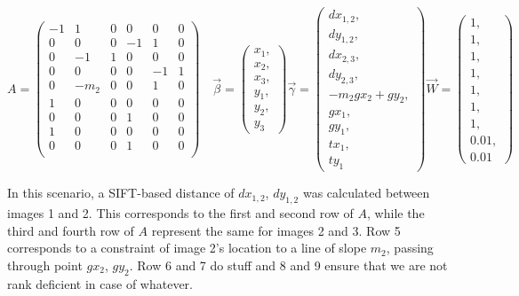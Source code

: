 \documentclass[]{spie}  %
\begin{document}
\[
A =
\begin{pmatrix}
  -1 & 1 & 0 & 0 & 0 & 0\\
  0 & 0 & 0 & -1 & 1 & 0\\
  0 & -1 & 1 & 0 & 0 & 0\\
  0 & 0 & 0 & 0 & -1 & 1\\
  0 & -m_2 & 0 & 0 & 1 & 0\\
  1 & 0 & 0 & 0 & 0 & 0\\
  0 & 0 & 0 & 1 & 0 & 0\\
  1 & 0 & 0 & 0 & 0 & 0\\
  0 & 0 & 0 & 1 & 0 & 0\\

\end{pmatrix}\quad
\vec{\beta} =
\begin{pmatrix}
  x_1, \\ x_2, \\ x_3, \\ y_1, \\ y_2, \\ y_3
\end{pmatrix}
\vec{\gamma} =
\begin{pmatrix}
  dx_{1,2}, \\ dy_{1,2}, \\ dx_{2,3}, \\ dy_{2,3}, \\ -m_2gx_2 + gy_2, 
  \\ gx_1, \\ gy_1, \\ tx_1, \\ ty_1
  
\end{pmatrix}
\vec{W} = 
\begin{pmatrix}
  1, \\ 1, \\ 1, \\ 1, \\ 1, \\ 1, \\ 1, \\ 0.01, \\ 0.01
\end{pmatrix}
\]


In this scenario, a SIFT-based distance of $dx_{1,2}$, $dy_{1,2}$ was
calculated between images 1 and 2. This corresponds to the first and
second row of $A$, while the third and fourth row of $A$ represent the
same for images 2 and 3. Row 5 corresponds to a constraint of image 2's location to a line of slope $m_2$, passing through point $gx_2$, $gy_2$. 
Row 6 and 7 do stuff and 8 and 9 ensure that we are not rank deficient in case of whatever.
\end{document}
